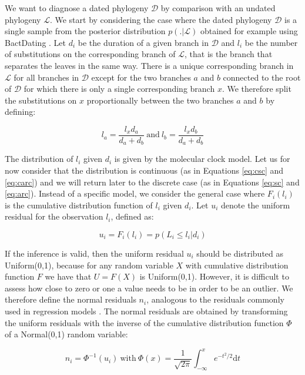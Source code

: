 \documentclass{article}
\begin{document}
We want to diagnose a dated phylogeny $\mathcal{D}$ by comparison with an undated phylogeny $\mathcal{L}$. We start by considering the case where the dated phylogeny $\mathcal{D}$ is a single sample from the posterior distribution $p(.|\mathcal{L})$ obtained for example using BactDating \citep{Didelot2018}.
Let $d_i$ be the duration of a given branch in $\mathcal{D}$ and $l_i$ be the number of substitutions on the corresponding branch of $\mathcal{L}$, that is the branch that separates the leaves in the same way. There is a unique corresponding branch in $\mathcal{L}$ for all branches in $\mathcal{D}$ except for the two branches $a$ and $b$ connected to the root of $\mathcal{D}$ for which there is only a single corresponding branch $x$. We therefore split the substitutions on $x$ proportionally between the two branches $a$ and $b$ by defining:

\begin{equation}
l_a = \frac{l_x d_a}{d_a+d_b}\mathrm{~and~}l_b = \frac{l_x d_b}{d_a+d_b}
\end{equation}

The distribution of $l_i$ given $d_i$ is given by the molecular clock model. 
Let us for now consider that the distribution
is continuous (as in Equations \ref{eq:csc} and \ref{eq:carc}) and we will return later to the discrete case 
(as in Equations \ref{eq:sc} and \ref{eq:arc}). 
Instead of a specific model, we consider the general case where
$F_i(l_i)$ is the cumulative distribution function of $l_i$ given $d_i$.
Let $u_i$ denote the uniform residual for the observation $l_i$, defined as:

\begin{equation}
u_i=F_i(l_i)=p(L_i\leq l_i|d_i)
\label{eq:unif-resid}
\end{equation}

If the inference is valid, then the uniform residual $u_i$ 
should be distributed as Uniform(0,1), because for any random variable $X$ with cumulative distribution function $F$ we have that $U=F(X)$ is Uniform(0,1). 
However, it is difficult to assess how close to zero or one a value needs to be in order to be 
an outlier. 
We therefore define the normal residuals $n_i$, analogous to the residuals commonly used in 
regression models \citep{coxGeneralDefinitionResiduals1968,dunnRandomizedQuantileResiduals1996}. 
The normal residuals are obtained 
by transforming the uniform residuals with the inverse of the cumulative distribution function $\Phi$ 
of a Normal(0,1) random variable:

\begin{equation}
n_i=\Phi^{-1}(u_i)\mathrm{~with~}\Phi(x)=\frac{1}{\sqrt{2\pi}}\int_{-\infty}^x e^{-t^2/2}\mathrm{d}t
\label{eq:norm-resid}
\end{equation}
\end{document}
